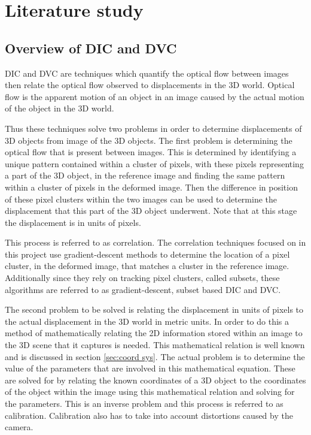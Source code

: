 \chapter{Literature study}
\section{Overview of DIC and DVC}
DIC and DVC are techniques which quantify the optical flow between images then relate the optical flow observed to displacements in the 3D world. Optical flow is the apparent motion of an object in an image caused by the actual motion of the object in the 3D world.

Thus these techniques solve two problems in order to determine displacements of 3D objects from image of the 3D objects. The first problem is determining the optical flow that is present between images. This is determined by identifying a unique pattern contained within a cluster of pixels, with these pixels representing a part  of the 3D object, in the reference image and finding the same pattern within a cluster of pixels in the deformed image. Then the difference in position of these pixel clusters within the two images can be used to determine the displacement that this part of the 3D object underwent. Note that at this stage the displacement is in units of pixels. 

This process is referred to as correlation. The correlation techniques focused on in this project use gradient-descent methods to determine the location of a pixel cluster, in the deformed image, that matches a cluster in the reference image. Additionally since they rely on tracking pixel clusters, called subsets, these algorithms are referred to as gradient-descent, subset based DIC and DVC.

The second problem to be solved is relating the displacement in units of pixels to the actual displacement in the 3D world in metric units. In order to do this a method of mathematically relating the 2D information stored within an image to the 3D scene that it captures is needed. This mathematical relation is well known and is discussed in section \ref{sec:coord sys}. The actual problem is to determine the value of the parameters that are involved in this mathematical equation. These are solved for by relating the known coordinates of a 3D object to the coordinates of the object within the image using this mathematical relation and solving for the parameters. This is an inverse problem and this process is referred to as calibration. Calibration also has to take into account distortions caused by the camera.

